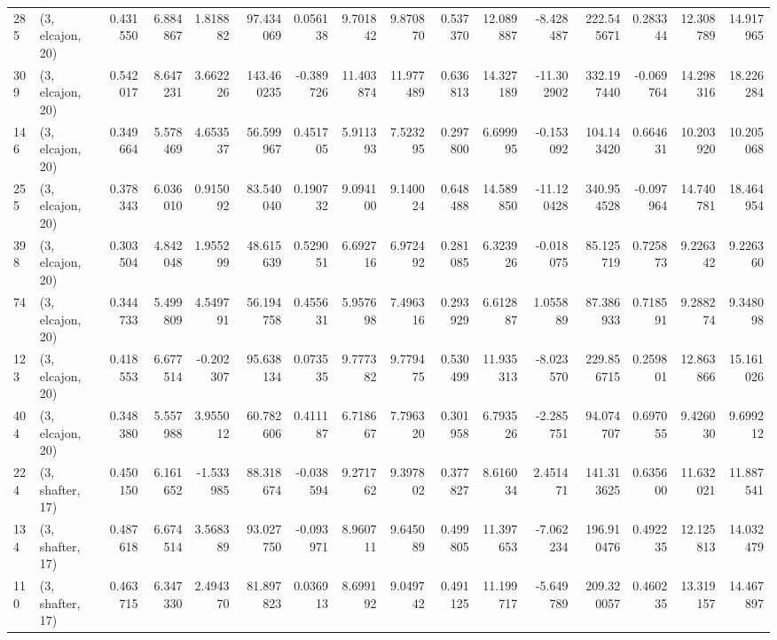 \begin{tabular}{llrrrrrrrrrrrrrr}
285 &  (3, elcajon, 20) &   0.431550 &   6.884867 &   1.818882 &    97.434069 &   0.056138 &   9.701842 &   9.870870 &  0.537370 &  12.089887 &  -8.428487 &   222.545671 &  0.283344 &  12.308789 &  14.917965 \\
309 &  (3, elcajon, 20) &   0.542017 &   8.647231 &   3.662226 &   143.460235 &  -0.389726 &  11.403874 &  11.977489 &  0.636813 &  14.327189 & -11.302902 &   332.197440 & -0.069764 &  14.298316 &  18.226284 \\
146 &  (3, elcajon, 20) &   0.349664 &   5.578469 &   4.653537 &    56.599967 &   0.451705 &   5.911393 &   7.523295 &  0.297800 &   6.699995 &  -0.153092 &   104.143420 &  0.664631 &  10.203920 &  10.205068 \\
255 &  (3, elcajon, 20) &   0.378343 &   6.036010 &   0.915092 &    83.540040 &   0.190732 &   9.094100 &   9.140024 &  0.648488 &  14.589850 & -11.120428 &   340.954528 & -0.097964 &  14.740781 &  18.464954 \\
398 &  (3, elcajon, 20) &   0.303504 &   4.842048 &   1.955299 &    48.615639 &   0.529051 &   6.692716 &   6.972492 &  0.281085 &   6.323926 &  -0.018075 &    85.125719 &  0.725873 &   9.226342 &   9.226360 \\
74  &  (3, elcajon, 20) &   0.344733 &   5.499809 &   4.549791 &    56.194758 &   0.455631 &   5.957698 &   7.496316 &  0.293929 &   6.612887 &   1.055889 &    87.386933 &  0.718591 &   9.288274 &   9.348098 \\
123 &  (3, elcajon, 20) &   0.418553 &   6.677514 &  -0.202307 &    95.638134 &   0.073535 &   9.777382 &   9.779475 &  0.530499 &  11.935313 &  -8.023570 &   229.856715 &  0.259801 &  12.863866 &  15.161026 \\
404 &  (3, elcajon, 20) &   0.348380 &   5.557988 &   3.955012 &    60.782606 &   0.411187 &   6.718667 &   7.796320 &  0.301958 &   6.793526 &  -2.285751 &    94.074707 &  0.697055 &   9.426030 &   9.699212 \\
224 &  (3, shafter, 17) &   0.450150 &   6.161652 &  -1.533985 &    88.318674 &  -0.038594 &   9.271762 &   9.397802 &  0.377827 &   8.616034 &   2.451471 &   141.313625 &  0.635600 &  11.632021 &  11.887541 \\
134 &  (3, shafter, 17) &   0.487618 &   6.674514 &   3.568389 &    93.027750 &  -0.093971 &   8.960711 &   9.645089 &  0.499805 &  11.397653 &  -7.062234 &   196.910476 &  0.492235 &  12.125813 &  14.032479 \\
110 &  (3, shafter, 17) &   0.463715 &   6.347330 &   2.494370 &    81.897823 &   0.036913 &   8.699192 &   9.049742 &  0.491125 &  11.199717 &  -5.649789 &   209.320057 &  0.460235 &  13.319157 &  14.467897 \\

\end{tabular}
